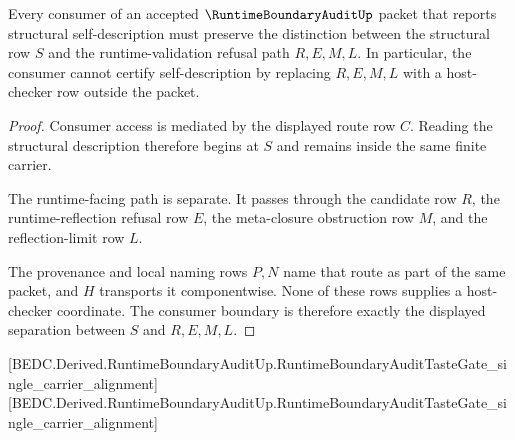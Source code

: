 \begin{theorem}
\label{thm:runtime-boundary-audit-consumer-boundary}
Every consumer of an accepted $\RuntimeBoundaryAuditUp$ packet that reports structural self-description must preserve the distinction between the structural row $S$ and the runtime-validation refusal path $R,E,M,L$. In particular, the consumer cannot certify self-description by replacing $R,E,M,L$ with a host-checker row outside the packet.
\end{theorem}
\begin{proof}
Consumer access is mediated by the displayed route row $C$. Reading the structural description therefore begins at $S$ and remains inside the same finite carrier.

The runtime-facing path is separate. It passes through the candidate row $R$, the runtime-reflection refusal row $E$, the meta-closure obstruction row $M$, and the reflection-limit row $L$.

The provenance and local naming rows $P,N$ name that route as part of the same packet, and $H$ transports it componentwise. None of these rows supplies a host-checker coordinate. The consumer boundary is therefore exactly the displayed separation between $S$ and $R,E,M,L$.
\end{proof}



[BEDC.Derived.RuntimeBoundaryAuditUp.RuntimeBoundaryAuditTasteGate\_single\_carrier\_alignment]
[BEDC.Derived.RuntimeBoundaryAuditUp.RuntimeBoundaryAuditTasteGate\_single\_carrier\_alignment]

